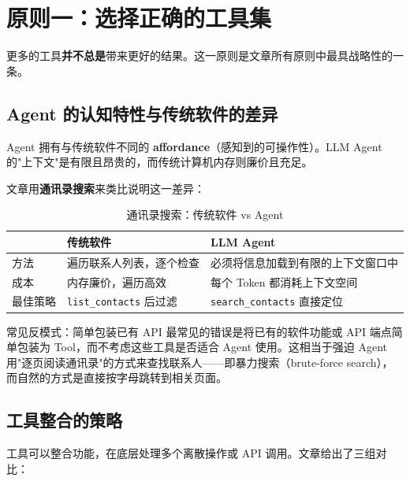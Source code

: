 \section{原则一：选择正确的工具集}

更多的工具\textbf{并不总是}带来更好的结果。这一原则是文章所有原则中最具战略性的一条。

\subsection{Agent 的认知特性与传统软件的差异}

Agent 拥有与传统软件不同的 \textbf{affordance}（感知到的可操作性）。LLM Agent 的"上下文"是有限且昂贵的，而传统计算机内存则廉价且充足。

文章用\textbf{通讯录搜索}来类比说明这一差异：

\begin{table}[H]
\centering
\caption{通讯录搜索：传统软件 vs Agent}
\begin{tabular}{p{}p{}p{}}
\toprule
 & \textbf{传统软件} & \textbf{LLM Agent} \\
\midrule
方法 & 遍历联系人列表，逐个检查 & 必须将信息加载到有限的上下文窗口中 \\
\midrule
成本 & 内存廉价，遍历高效 & 每个 Token 都消耗上下文空间 \\
\midrule
最佳策略 & \texttt{list\_contacts} 后过滤 & \texttt{search\_contacts} 直接定位 \\
\bottomrule
\end{tabular}
\end{table}

\begin{warningbox}{常见反模式：简单包装已有 API}
最常见的错误是将已有的软件功能或 API 端点简单包装为 Tool，而不考虑这些工具是否适合 Agent 使用。这相当于强迫 Agent 用"逐页阅读通讯录"的方式来查找联系人——即暴力搜索（brute-force search），而自然的方式是直接按字母跳转到相关页面。
\end{warningbox}

\subsection{工具整合的策略}

工具可以整合功能，在底层处理多个离散操作或 API 调用。文章给出了三组对比：

